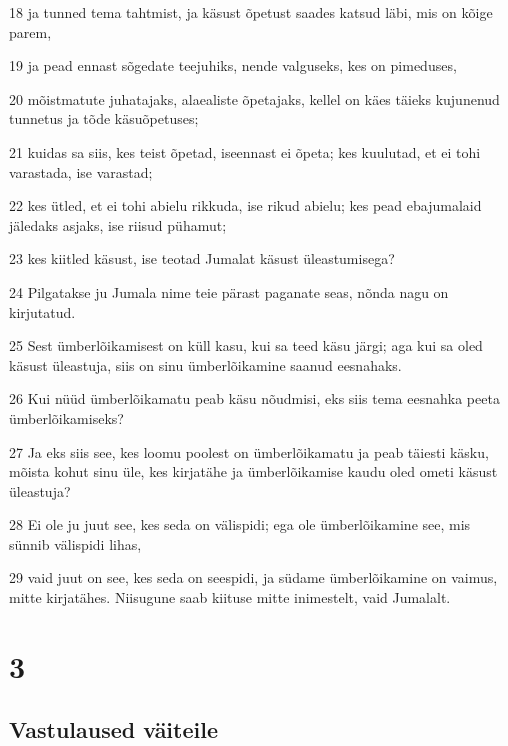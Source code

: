 \par 18 ja tunned tema tahtmist, ja käsust õpetust saades katsud läbi, mis on kõige parem,
\par 19 ja pead ennast sõgedate teejuhiks, nende valguseks, kes on pimeduses,
\par 20 mõistmatute juhatajaks, alaealiste õpetajaks, kellel on käes täieks kujunenud tunnetus ja tõde käsuõpetuses;
\par 21 kuidas sa siis, kes teist õpetad, iseennast ei õpeta; kes kuulutad, et ei tohi varastada, ise varastad;
\par 22 kes ütled, et ei tohi abielu rikkuda, ise rikud abielu; kes pead ebajumalaid jäledaks asjaks, ise riisud pühamut;
\par 23 kes kiitled käsust, ise teotad Jumalat käsust üleastumisega?
\par 24 Pilgatakse ju Jumala nime teie pärast paganate seas, nõnda nagu on kirjutatud.
\par 25 Sest ümberlõikamisest on küll kasu, kui sa teed käsu järgi; aga kui sa oled käsust üleastuja, siis on sinu ümberlõikamine saanud eesnahaks.
\par 26 Kui nüüd ümberlõikamatu peab käsu nõudmisi, eks siis tema eesnahka peeta ümberlõikamiseks?
\par 27 Ja eks siis see, kes loomu poolest on ümberlõikamatu ja peab täiesti käsku, mõista kohut sinu üle, kes kirjatähe ja ümberlõikamise kaudu oled ometi käsust üleastuja?
\par 28 Ei ole ju juut see, kes seda on välispidi; ega ole ümberlõikamine see, mis sünnib välispidi lihas,
\par 29 vaid juut on see, kes seda on seespidi, ja südame ümberlõikamine on vaimus, mitte kirjatähes. Niisugune saab kiituse mitte inimestelt, vaid Jumalalt.


\chapter{3}

\section*{Vastulaused väiteile}

